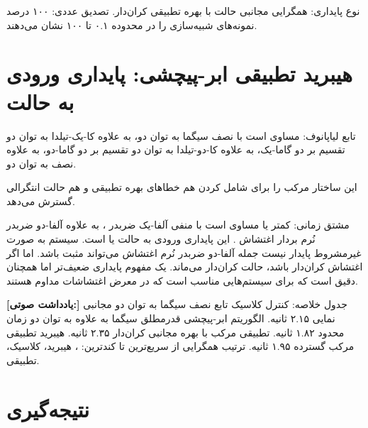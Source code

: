 \documentclass[12pt, a4paper]{article}
\newcommand{\dash}{\lr{---}}
\begin{document}
نوع پايداری: همگرايی مجانبی حالت با بهره تطبيقی کران‌دار. تصديق عددی: ۱۰۰ درصد نمونه‌های شبيه‌سازی  را در محدوده ۰.۱ تا ۱۰۰ نشان می‌دهند.

\section{هيبريد تطبيقی ابر-پيچشی: پايداری ورودی به حالت}

تابع لياپانوف:  مساوی است با نصف سيگما به توان دو، به علاوه کا-يک-تيلدا به توان دو تقسيم بر دو گاما-يک، به علاوه کا-دو-تيلدا به توان دو تقسيم بر دو گاما-دو، به علاوه نصف  به توان دو.

اين ساختار مرکب را برای شامل کردن هم خطاهای بهره تطبيقی و هم حالت انتگرالی گسترش می‌دهد.

مشتق زمانی:  کمتر يا مساوی است با منفی آلفا-يک ضربدر ، به علاوه آلفا-دو ضربدر نُرم بردار اغتشاش . اين پايداری ورودی به حالت يا  است. سيستم به صورت غيرمشروط پايدار نيست \dash{} جمله آلفا-دو ضربدر نُرم اغتشاش می‌تواند مثبت باشد. اما اگر اغتشاش کران‌دار باشد، حالت کران‌دار می‌ماند.  يک مفهوم پايداری ضعيف‌تر اما همچنان دقيق است که برای سيستم‌هايی مناسب است که در معرض اغتشاشات مداوم هستند.


\begin{mdframed}[
  backgroundcolor=audiotan,
  linecolor=audionote!70,
  linewidth=1pt,
  innerleftmargin=12pt,
  innerrightmargin=12pt,
  innertopmargin=8pt,
  innerbottommargin=8pt
]
\textbf{\color{audionote}[يادداشت صوتی:]}
جدول خلاصه: کنترل کلاسيک \dash{} تابع نصف سيگما به توان دو \dash{} مجانبی نمايی \dash{} ۲.۱۵ ثانيه. الگوريتم ابر-پيچشی \dash{} قدرمطلق سيگما به علاوه  به توان دو \dash{} زمان محدود \dash{} ۱.۸۲ ثانيه. تطبيقی \dash{} مرکب با بهره \dash{} مجانبی کران‌دار \dash{} ۲.۳۵ ثانيه. هيبريد تطبيقی \dash{} مرکب گسترده \dash{}  \dash{} ۱.۹۵ ثانيه. ترتيب همگرايی از سريع‌ترين تا کندترين: ، هيبريد، کلاسيک، تطبيقی.
\end{mdframed}

\vspace{0.6cm}

\section{نتيجه‌گيری}
\end{document}
